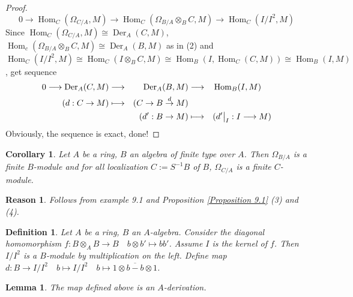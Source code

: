 \documentclass{ctexart}
\newtheorem{definition}{Definition}[section]
\newtheorem{lemma}{Lemma}[section]
\newtheorem{reason}{Reason}[section]
\newtheorem{corollary}{Corollary}[section]
\renewcommand{\hom}{\operatorname{Hom}}
\newcommand{\derivation}{\operatorname{Der}}
\begin{document}
\begin{proof}
    \begin{equation*}
        0 \longrightarrow \hom_{C}(\Omega_{C/A}, M) \longrightarrow \hom_{C}(\Omega_{B/A} \otimes_{B} C, M) \longrightarrow \hom_{C}(I/I^{2}, M)    
    \end{equation*}
    Since $\hom_{C}(\Omega_{C/A}, M) \cong \derivation_{A}(C, M)$, $\hom_{c}(\Omega_{B/A} \otimes_{B} C, M) \cong \derivation_{A}(B, M)$ as in (2) and $\hom_{C}(I/I^{2}, M) \cong \hom_{C}(I \otimes_{B} C, M) \cong \hom_{B}(I, \hom_{C}(C, M)) \cong \hom_{B}(I, M)$, get sequence
    \begin{equation*}
        \begin{aligned}
            0 \longrightarrow \derivation_{A}(C, M) & \longrightarrow & \derivation_{A}(B, M) & \longrightarrow && \hom_{B}(I, M) \\
            (d: C \rightarrow M) & \longmapsto & (C \rightarrow B \overset{d}{\rightarrow} M) &&& \\
            && (d': B \rightarrow M) & \longmapsto && (d'\big{|}_{I}: I \longrightarrow M)
        \end{aligned}
    \end{equation*}
    Obviously, the sequence is exact, done!
\end{proof}
\begin{corollary}
    Let $A$ be a ring, $B$ an algebra of finite type over $A$.
    Then $\Omega_{B/A}$ is a finite $B$-module and for all localization $C := S^{-1}B$ of $B$, $\Omega_{C/A}$ is a finite $C$-module.
    \label{Corollary 9.1}
\end{corollary}
\begin{reason}
    Follows from example 9.1 and Proposition \ref{Proposition 9.1} (3) and (4).
\end{reason}
\begin{definition}
    Let $A$ be a ring, $B$ an $A$-algebra.
    Consider the diagonal homomorphism $f: B \otimes_{A} B \longrightarrow B\quad b \otimes b' \longmapsto bb'$.
    Assume $I$ is the kernel of $f$.
    Then $I/I^{2}$ is a $B$-module by multiplication on the left.
    Define map $d: B \longrightarrow I/I^{2}\quad b \longmapsto I/I^{2}\quad b \longmapsto \overline{1 \otimes b - b \otimes 1}$.
\end{definition}
\begin{lemma}
    The map defined above is an $A$-derivation.
    \label{Lemma 9.1}
\end{lemma}
\end{document}
